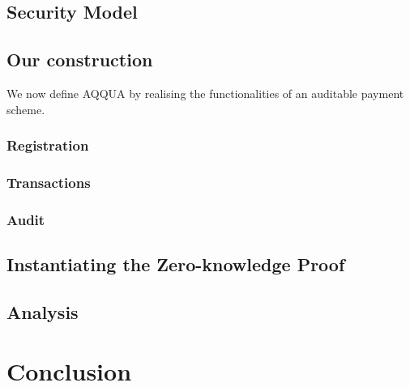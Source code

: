 \documentclass[11pt, twoside, a4paper]{report}
\begin{document}
        \section{Security Model}\label{sec:model}
        
        
        

        \section{Our construction}\label{sec:scheme}
        We now define AQQUA by realising the functionalities of an auditable payment scheme.

        
        \subsection{Registration}
            
            
            
        \subsection{Transactions}  
            
            
            
            
            
        \subsection{Audit}
            
            
        
        \section{Instantiating the Zero-knowledge Proof}
        
        \section{Analysis}
            


    \chapter{Conclusion}
    

    \printbibliography
\end{document}
